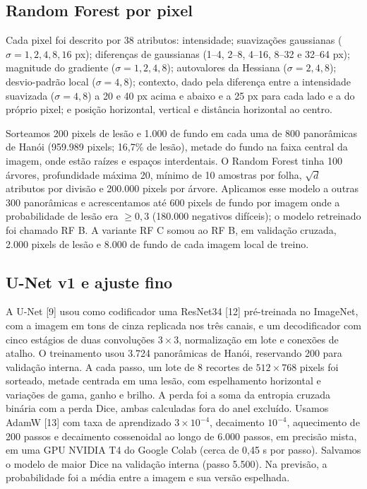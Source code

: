 \documentclass[twocolumn]{article}
\begin{document}
\subsection{Random Forest por pixel}

Cada pixel foi descrito por 38 atributos: intensidade; suavizações gaussianas ($\sigma = 1, 2, 4, 8, 16$ px); diferenças de gaussianas (1--4, 2--8, 4--16, 8--32 e 32--64 px); magnitude do gradiente ($\sigma = 1, 2, 4, 8$); autovalores da Hessiana ($\sigma = 2, 4, 8$); desvio-padrão local ($\sigma = 4, 8$); contexto, dado pela diferença entre a intensidade suavizada ($\sigma = 4, 8$) a 20 e 40 px acima e abaixo e a 25 px para cada lado e a do próprio pixel; e posição horizontal, vertical e distância horizontal ao centro.

Sorteamos 200 pixels de lesão e 1.000 de fundo em cada uma de 800 panorâmicas de Hanói (959.989 pixels; 16,7\% de lesão), metade do fundo na faixa central da imagem, onde estão raízes e espaços interdentais. O Random Forest tinha 100 árvores, profundidade máxima 20, mínimo de 10 amostras por folha, $\sqrt{d}$ atributos por divisão e 200.000 pixels por árvore. Aplicamos esse modelo a outras 300 panorâmicas e acrescentamos até 600 pixels de fundo por imagem onde a probabilidade de lesão era $\geq 0{,}3$ (180.000 negativos difíceis); o modelo retreinado foi chamado RF B. A variante RF C somou ao RF B, em validação cruzada, 2.000 pixels de lesão e 8.000 de fundo de cada imagem local de treino.

\subsection{U-Net v1 e ajuste fino}

A U-Net [9] usou como codificador uma ResNet34 [12] pré-treinada no ImageNet, com a imagem em tons de cinza replicada nos três canais, e um decodificador com cinco estágios de duas convoluções $3 \times 3$, normalização em lote e conexões de atalho. O treinamento usou 3.724 panorâmicas de Hanói, reservando 200 para validação interna. A cada passo, um lote de 8 recortes de $512 \times 768$ pixels foi sorteado, metade centrada em uma lesão, com espelhamento horizontal e variações de gama, ganho e brilho. A perda foi a soma da entropia cruzada binária com a perda Dice, ambas calculadas fora do anel excluído. Usamos AdamW [13] com taxa de aprendizado $3 \times 10^{-4}$, decaimento $10^{-4}$, aquecimento de 200 passos e decaimento cossenoidal ao longo de 6.000 passos, em precisão mista, em uma GPU NVIDIA T4 do Google Colab (cerca de 0,45 s por passo). Salvamos o modelo de maior Dice na validação interna (passo 5.500). Na previsão, a probabilidade foi a média entre a imagem e sua versão espelhada.
\end{document}
